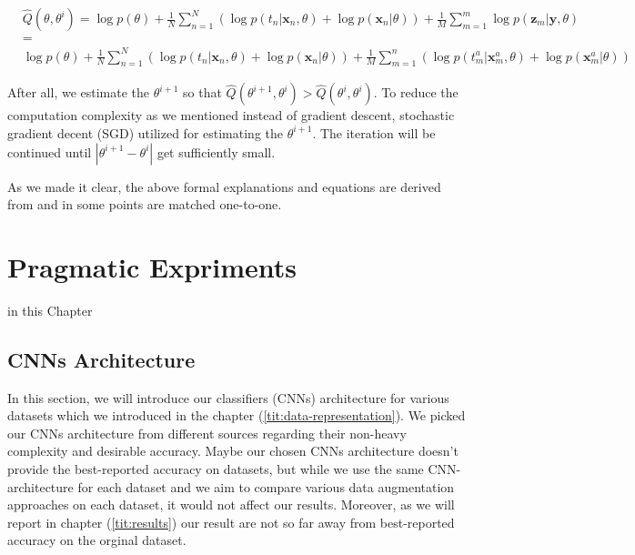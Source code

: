 \begin{equation}
  \begin{aligned}
     & \hat{Q}\left(\theta, \theta^{i}\right)=\log p(\theta)+\frac{1}{N} \sum_{n=1}^{N}\left(\log p\left(t_{n} | \mathbf{x}_{n}, \theta\right)+\log p\left(\mathbf{x}_{n} | \theta\right)\right)+\frac{1}{M} \sum_{m=1}^{m} \log p\left(\mathbf{z}_{m} | \mathbf{y}, \theta\right) \\
     & =                                                                                                                                                                                                                                                                           \\
     & \log p(\theta)+\frac{1}{N} \sum_{n=1}^{N}\left(\log p\left(t_{n} | \mathbf{x}_{n}, \theta\right)+\log p\left(\mathbf{x}_{n} | \theta\right)\right)+\frac{1}{M}
    \sum_{m=1}^{n}\left(\log p\left(t_{m}^{a} | \mathbf{x}_{m}^{a}, \theta\right)+\log p\left(\mathbf{x}_{m}^{a} | \theta\right)\right)
  \end{aligned}
\end{equation}

After all, we estimate the $\theta^{i +1}$ so that $\hat{Q}(\theta^{i +1}, \theta^{i}) >
  \hat{Q}(\theta^{i}, \theta^{i})$. To reduce the computation complexity as we mentioned instead of
gradient descent, stochastic gradient decent (SGD) utilized for estimating the $\theta^{i +1}$. The
iteration will be continued until $|\theta^{i +1} - \theta^{i}|$ get sufficiently small.

As we made it clear, the above formal explanations and equations are derived from \cite{refrence_bayesian_approach} and in some points are matched one-to-one.


\chapter{Pragmatic Expriments}
in this Chapter

\section{CNNs Architecture}
In this section, we will introduce our classifiers (CNNs) architecture for various datasets which we
introduced in the chapter (\ref{tit:data-representation}). We picked our CNNs architecture from
different sources regarding their non-heavy complexity and desirable accuracy.  Maybe our chosen
CNNs architecture doesn't provide the best-reported accuracy on datasets, but while we use the
same CNN-architecture for each dataset and we aim to compare various data augmentation approaches on
each dataset, it would not affect our results. Moreover, as we will report in chapter (\ref{tit:results})
our result are not so far away from best-reported accuracy on the orginal dataset.


